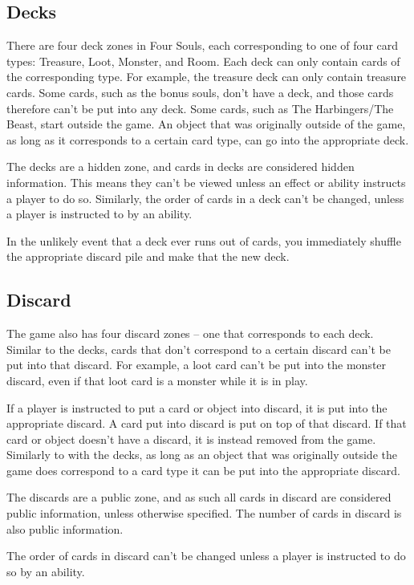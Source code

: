 \documentclass[10pt, a4paper, twoside]{article} %
\begin{document}
    \subsection{Decks}
    There are four deck zones in Four Souls, each corresponding to one of four card types: Treasure, Loot, Monster, and Room. Each deck can only contain cards of the corresponding type. For example, the treasure deck can only contain treasure cards. Some cards, such as the bonus souls, don’t have a deck, and those cards therefore can’t be put into any deck. Some cards, such as The Harbingers/The Beast, start outside the game. An object that was originally outside of the game, as long as it corresponds to a certain card type, can go into the appropriate deck.

    The decks are a hidden zone, and cards in decks are considered hidden information. This means they can’t be viewed unless an effect or ability instructs a player to do so. Similarly, the order of cards in a deck can’t be changed, unless a player is instructed to by an ability.

    In the unlikely event that a deck ever runs out of cards, you immediately shuffle the appropriate discard pile and make that the new deck.

    \subsection{Discard}
    The game also has four discard zones – one that corresponds to each deck. Similar to the decks, cards that don’t correspond to a certain discard can’t be put into that discard. For example, a loot card can’t be put into the monster discard, even if that loot card is a monster while it is in play.

    If a player is instructed to put a card or object into discard, it is put into the appropriate discard. A card put into discard is put on top of that discard. If that card or object doesn’t have a discard, it is instead removed from the game. Similarly to with the decks, as long as an object that was originally outside the game does correspond to a card type it can be put into the appropriate discard.

    The discards are a public zone, and as such all cards in discard are considered public information, unless otherwise specified. The number of cards in discard is also public information.

    The order of cards in discard can’t be changed unless a player is instructed to do so by an ability.
\end{document}
